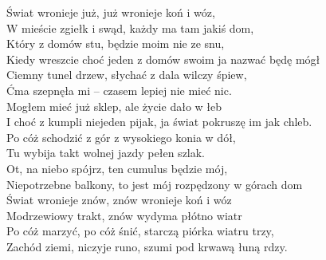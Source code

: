 
Świat wronieje już, już wronieje koń i wóz,   \tab{}\tab{} \\
W mieście zgiełk i swąd, każdy ma tam jakiś dom,  \tab{} \\
Który z domów stu, będzie moim nie ze snu,  \tab{}\tab{} \\
Kiedy wreszcie choć jeden z domów swoim ja nazwać będę mógł  \\
\hops
Ciemny tunel drzew, słychać z dala wilczy śpiew, \\
Ćma szepnęła mi – czasem lepiej nie mieć nic. \\
Mogłem mieć już sklep, ale życie dało w łeb \\
I choć z kumpli niejeden pijak, ja świat pokruszę im jak chleb. \\
\hops
Po cóż schodzić z gór z wysokiego konia w dół, \\
Tu wybija takt wolnej jazdy pełen szlak. \\
Ot, na niebo spójrz, ten cumulus będzie mój, \\
Niepotrzebne balkony, to jest mój rozpędzony w górach dom \\
\hops
Świat wronieje znów, znów wronieje koń i wóz \\
Modrzewiowy trakt, znów wydyma płótno wiatr \\
Po cóż marzyć, po cóż śnić, starczą piórka wiatru trzy, \\
Zachód ziemi, niczyje runo, szumi pod krwawą łuną rdzy.
